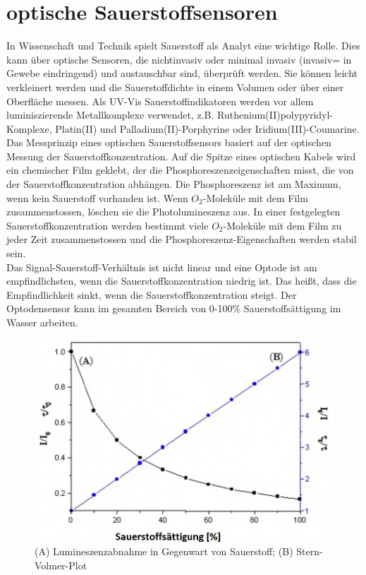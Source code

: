 \section{optische Sauerstoffsensoren}
In Wissenschaft und Technik spielt Sauerstoff als Analyt eine wichtige Rolle. Dies kann über optische Sensoren, die nichtinvasiv oder minimal invasiv (invasiv= in Gewebe eindringend) und austauschbar sind, überprüft werden. Sie können leicht verkleinert werden und die Sauerstoffdichte in einem Volumen oder über einer Oberfläche messen. Als UV-Vis Sauerstoffindikatoren werden vor allem luminiszierende Metallkomplexe verwendet, z.B. Ruthenium(II)polypyridyl-Komplexe, Platin(II) und Palladium(II)-Porphyrine oder Iridium(III)-Coumarine. \cite{[6]}
\\Das Messprinzip eines optischen Sauerstoffsensors basiert auf der optischen Messung der Sauerstoffkonzentration. Auf die Spitze eines optischen Kabels wird ein chemischer Film geklebt, der die Phosphoreszenzeigenschaften misst, die von der Sauerstoffkonzentration abhängen. Die Phosphoreszenz ist am Maximum, wenn kein Sauerstoff vorhanden ist. Wenn $O_2$-Moleküle mit dem Film zusammenstossen, löschen sie die Photolumineszenz aus. In einer festgelegten Sauerstoffkonzentration werden bestimmt viele $O_2$-Moleküle mit dem Film zu jeder Zeit zusammenstossen und die Phosphoreszenz-Eigenschaften werden stabil sein.
\\Das Signal-Sauerstoff-Verhältnis ist nicht linear und eine Optode ist am empfindlichsten, wenn die Sauerstoffkonzentration niedrig ist. Das heißt, dass die Empfindlichkeit sinkt, wenn die Sauerstoffkonzentration steigt. Der Optodensensor kann im gesamten Bereich von 0-100$\%$ Sauerstoffsättigung im Wasser arbeiten.
\begin{figure}[!htpb]
\centering
\includegraphics[scale=0.5]{graphics/stern-volmer}
\caption{(A) Lumineszenzabnahme in Gegenwart von Sauerstoff; (B) Stern-Volmer-Plot}

\end{figure}
